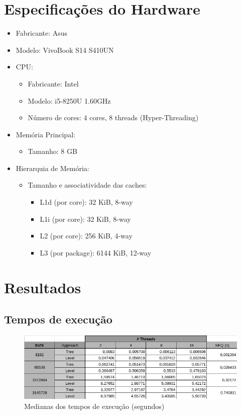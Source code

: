 \documentclass{article}
\begin{document}
\printbibliography

\newpage 
\begin{appendices}

\section{Especificações do Hardware}
\label{hardware}
\begin{itemize}
    \item Fabricante: Asus
    \item Modelo: VivoBook S14 S410UN
    \item CPU:
        \begin{itemize}
            \item Fabricante: Intel
            \item Modelo: i5-8250U 1.60GHz
            \item Número de cores: 4 cores, 8 threads (Hyper-Threading)
        \end{itemize}
    \item Memória Principal:
        \begin{itemize}
            \item Tamanho: 8 GB
        \end{itemize}
    \item Hierarquia de Memória:
        \begin{itemize}
            \item Tamanho e associatividade das caches:
                \begin{itemize}
                    \item L1d (por core): 32 KiB, 8-way
                    \item L1i (por core): 32 KiB, 8-way
                    \item L2 (por core): 256 KiB, 4-way
                    \item L3 (por package): 6144 KiB, 12-way
                \end{itemize}
        \end{itemize}
\end{itemize}

\section{Resultados}

\subsection{Tempos de execução}
\begin{figure}[H]
    \centering
    \includegraphics[width=18cm]{Pictures/tableTimes.png}
    \caption{Medianas dos tempos de execução (segundos)}
    \label{fig:table_times}
\end{figure}


\end{appendices}
\end{document}

